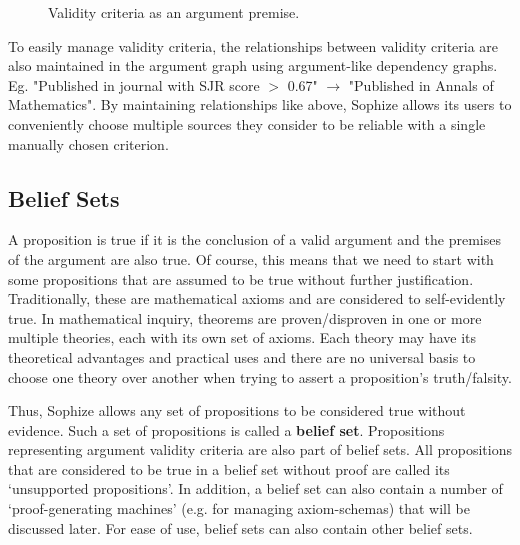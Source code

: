\documentclass[a4paper]{article}
\begin{document}
\begin{figure}[htbp]
\begin{center}
\caption{Validity criteria as an argument premise.}
\label{validity_criterion}
\end{center}
\end{figure}

To easily manage validity criteria, the relationships between validity criteria are also maintained in the argument graph using argument-like dependency graphs. Eg. "Published in journal with SJR score $>$ 0.67" $\rightarrow$ "Published in Annals of Mathematics". By maintaining relationships like above, Sophize allows its users to conveniently choose multiple sources they consider to be reliable with a single manually chosen criterion. 

\subsection{Belief Sets}
\label{sec:bset}

A proposition is true if it is the conclusion of a valid argument and the premises of the argument are also true. Of course, this means that we need to start with some propositions that are assumed to be true without further justification. Traditionally, these are mathematical axioms and are considered to self-evidently true. In mathematical inquiry, theorems are proven/disproven in one or more multiple theories, each with its own set of axioms. Each theory may have its theoretical advantages and practical uses and there are no universal basis to choose one theory over another when trying to assert a proposition's truth/falsity.

Thus, Sophize allows any set of propositions to be considered true without evidence. Such a set of propositions is called a \textbf{belief set}. Propositions representing argument validity criteria are also part of belief sets. All propositions that are considered to be true in a belief set without proof are called its `unsupported propositions'. In addition, a belief set can also contain a number of `proof-generating machines' (e.g. for managing axiom-schemas) that will be discussed later. For ease of use, belief sets can also contain other belief sets.
\end{document}
